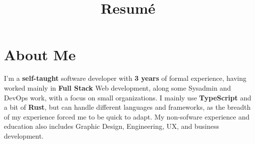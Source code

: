 \documentclass[11pt,a4paper,sans]{moderncv}
\title{Resumé}
\begin{document}
\setsansfont{Helvetica Neue LT Std 47 Light Condensed}
\setmonofont{Fira Code}


\makecvtitle %


\section{About Me}

 { \flushleft I'm a \textbf{self-taught} software developer with \textbf{3 years} of formal experience, having worked mainly in \textbf{Full Stack} Web development, along some Sysadmin and DevOps work, with a focus on small organizations. I mainly use \textbf{TypeScript} and a bit of \textbf{Rust}, but can handle different languages and frameworks, as the breadth of my experience forced me to be quick to adapt. My non-sofware experience and education also includes Graphic Design, Engineering, UX, and business development.

 }

\end{document}
